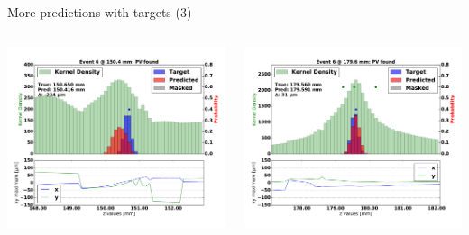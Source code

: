 \begin{frame}{More predictions with targets (3)}
  \begin{columns}[c]
        \begin{center}
           \includegraphics[width=1\textwidth, trim=60 0 60 0]{images/07Jan19_AltCNN4Layer_D35_sp_35.pdf}
        \end{center}
        \begin{center}
           \includegraphics[width=1\textwidth, trim=60 0 60 0]{images/07Jan19_AltCNN4Layer_D35_sp_36.pdf}
       \end{center}
  \end{columns}
\end{frame}
